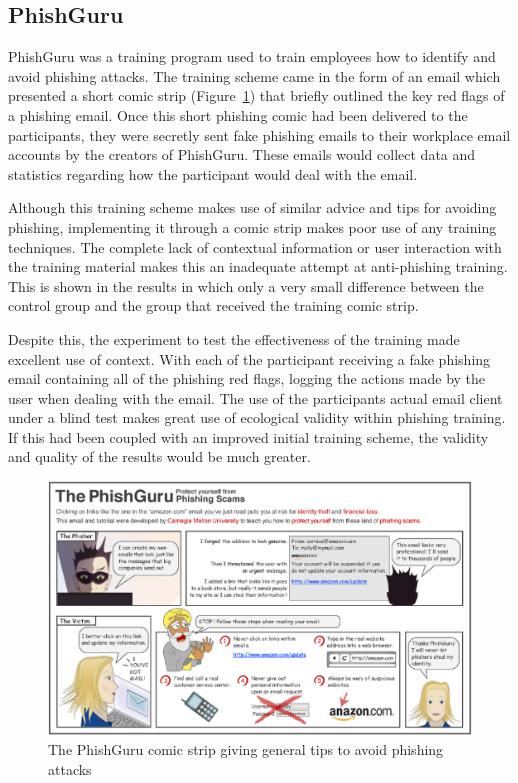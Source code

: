 \documentclass{l4proj}
\begin{document}
\subsection{PhishGuru}
PhishGuru \citep{kumaraguru2008lessons} was a training program used to train employees how to identify and avoid phishing attacks. The training scheme came in the form of an email which presented a short comic strip (Figure~\ref{fig:phishguru}) that briefly outlined the key red flags of a phishing email. Once this short phishing comic had been delivered to the participants, they were secretly sent fake phishing emails to their workplace email accounts by the creators of PhishGuru. These emails would collect data and statistics regarding how the participant would deal with the email. 

Although this training scheme makes use of similar advice and tips for avoiding phishing, implementing it through a comic strip makes poor use of any training techniques. The complete lack of contextual information or user interaction with the training material makes this an inadequate attempt at anti-phishing training. This is shown in the results in which only a very small difference between the control group and the group that received the training comic strip.

Despite this, the experiment to test the effectiveness of the training made excellent use of context. With each of the participant receiving a fake phishing email containing all of the phishing red flags, logging the actions made by the user when dealing with the email. The use of the participants actual email client under a blind test makes great use of ecological validity within phishing training. If this had been coupled with an improved initial training scheme, the validity and quality of the results would be much greater.

\begin{figure}[H]
    \centering
    \includegraphics[width=1\linewidth]{images/phishguru.png}    
    \caption{The PhishGuru comic strip giving general tips to avoid phishing attacks }
    \label{fig:phishguru} 
\end{figure}
\end{document}
